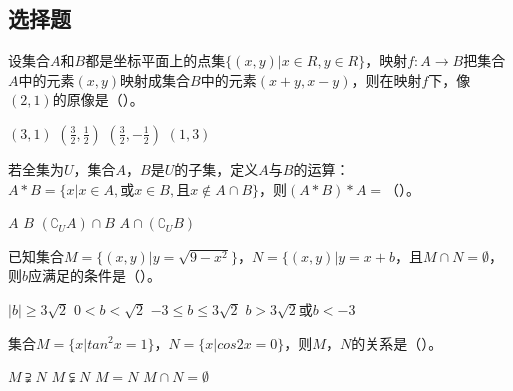 \documentclass[a4paper,addpoints,11pt]{exam}
\begin{document}
\begin{common-format}


\noindent{}


\section{选择题}
\begin{questions}
\question
设集合$ A $和$B$都是坐标平面上的点集$\{(x,y)|x\in R, y\in R\}$，映射$f:A→B$把集合$A$中的元素$(x,y)$映射成集合$B$中的元素$(x+y,x-y)$，则在映射$f$下，像$(2,1)$的原像是（\hspace{2em}）。\\
\begin{oneparchoices}
\choice $ (3,1) $
\choice $ (\frac{3}{2},\frac{1}{2})$
\choice $ (\frac{3}{2},-\frac{1}{2}) $
\choice $ (1,3) $
\end{oneparchoices}

\question
若全集为$U$，集合$A$，$B$是$U$的子集，定义$A$与$B$的运算：$A\ast B=\{x|x\in A, \text{或} x \in B, \text{且} x\notin A\cap B\}$，则$(A\ast B)\ast A=$（\hspace{2em}）。\\
\begin{oneparchoices}
\choice $ A $
\choice $ B$
\choice $ (\complement _U A)\cap B $
\choice $ A\cap (\complement _U B) $
\end{oneparchoices}



\question
已知集合$ M=\{(x,y)|y=\sqrt{9-x^2}\} $，$ N=\{(x,y)|y=x+b $，且$ M\cap N=\emptyset $，则$ b $应满足的条件是（\hspace{2em}）。\\
\begin{oneparchoices}
\choice $ \left| b \right| \geq 3\sqrt{2} $
\choice $ 0< b <\sqrt{2}$
\choice $ -3\leq b \leq 3\sqrt{2} $
\choice $ b>3\sqrt{2} \text{或} b<-3 $
\end{oneparchoices}


\question
集合$ M =\{x|tan^2x=1\}$，$ N=\{x|cos2x=0\} $，则$ M $，$ N $的关系是（\hspace{2em}）。
\begin{oneparchoices}
\choice $ M\supsetneqq N $
\choice $ M\subsetneqq N $
\choice $ M=N $
\choice $ M\cap N=\emptyset $
\end{oneparchoices}
\end{questions}



\end{common-format}
\end{document}
